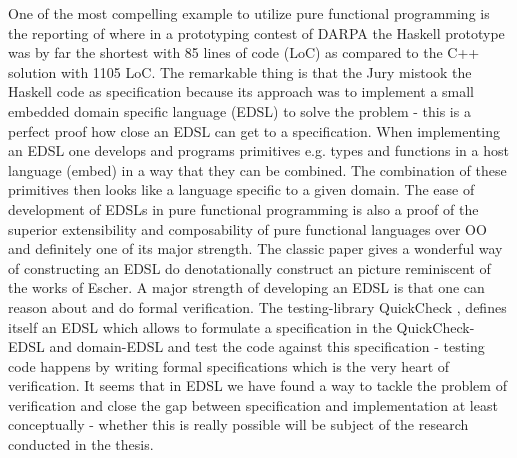 One of the most compelling example to utilize pure functional programming is the reporting of \cite{hudak_haskell_1994} where in a prototyping contest of DARPA the Haskell prototype was by far the shortest with 85 lines of code (LoC) as compared to the C++ solution with 1105 LoC. The remarkable thing is that the Jury mistook the Haskell code as specification because its approach was to implement a small embedded domain specific language (EDSL) to solve the problem - this is a perfect proof how close an EDSL can get to a specification. When implementing an EDSL one develops and programs primitives e.g. types and functions in a host language (embed) in a way that they can be combined. The combination of these primitives then looks like a language specific to a given domain. The ease of development of EDSLs in pure functional programming is also a proof of the superior extensibility and composability of pure functional languages over OO and definitely one of its major strength. The classic paper \cite{henderson_functional_1982} gives a wonderful way of constructing an EDSL do denotationally construct an picture reminiscent of the works of Escher.
A major strength of developing an EDSL is that one can reason about and do formal verification. The testing-library QuickCheck \cite{claessen_quickcheck:_2000}, \cite{claessen_testing_2002} defines itself an EDSL which allows to formulate a specification in the QuickCheck- EDSL and domain-EDSL and test the code against this specification - testing code happens by writing formal specifications which is the very heart of verification. 
It seems that in EDSL we have found a way to tackle the problem of verification and close the gap between specification and implementation at least conceptually - whether this is really possible will be subject of the research conducted in the thesis.


